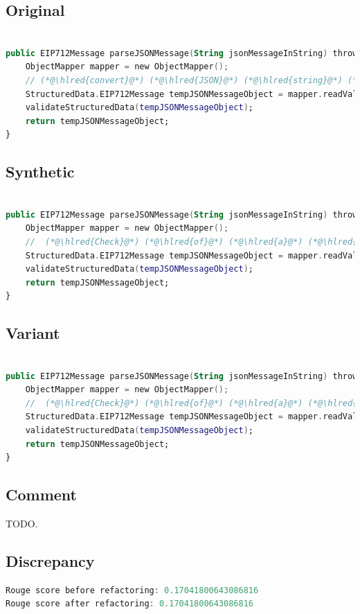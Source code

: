 \documentclass[usenames,dvipsnames]{article} %
\DeclareRobustCommand{\hlred}[1]{{\sethlcolor{pink}\hl{#1}}}
\begin{document}
\subsection{Original}
\begin{lstlisting}[language=kotlin]

public EIP712Message parseJSONMessage(String jsonMessageInString) throws IOException, RuntimeException {
    ObjectMapper mapper = new ObjectMapper();
    // (*@\hlred{convert}@*) (*@\hlred{JSON}@*) (*@\hlred{string}@*) (*@\hlred{to}@*) (*@\hlred{EIP712Message}@*) (*@\hlred{object}@*)
    StructuredData.EIP712Message tempJSONMessageObject = mapper.readValue(jsonMessageInString, EIP712Message.class);
    validateStructuredData(tempJSONMessageObject);
    return tempJSONMessageObject;
}
\end{lstlisting}
\subsection{Synthetic}

\begin{lstlisting}[language=kotlin]

public EIP712Message parseJSONMessage(String jsonMessageInString) throws IOException, RuntimeException {
    ObjectMapper mapper = new ObjectMapper();
    //  (*@\hlred{Check}@*) (*@\hlred{of}@*) (*@\hlred{a}@*) (*@\hlred{null}@*) (*@\hlred{string}@*) (*@\hlred{from}@*)
    StructuredData.EIP712Message tempJSONMessageObject = mapper.readValue(jsonMessageInString, EIP712Message.class);
    validateStructuredData(tempJSONMessageObject);
    return tempJSONMessageObject;
}
\end{lstlisting}

\subsection{Variant}

\begin{lstlisting}[language=kotlin]

public EIP712Message parseJSONMessage(String jsonMessageInString) throws IOException, RuntimeException {
    ObjectMapper mapper = new ObjectMapper();
    //  (*@\hlred{Check}@*) (*@\hlred{of}@*) (*@\hlred{a}@*) (*@\hlred{null}@*) (*@\hlred{string}@*) (*@\hlred{in}@*)
    StructuredData.EIP712Message tempJSONMessageObject = mapper.readValue(EIP712Message.class(*@\hlred{, jsonMessageInString}@*));
    validateStructuredData(tempJSONMessageObject);
    return tempJSONMessageObject;
}
\end{lstlisting}

\subsection{Comment}

TODO.

\subsection{Discrepancy}

\begin{lstlisting}[language=kotlin]
Rouge score before refactoring: 0.17041800643086816
Rouge score after refactoring: 0.17041800643086816
\end{lstlisting}
\end{document}
